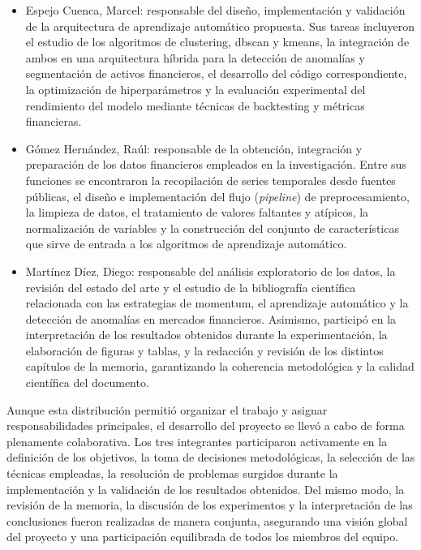 \documentclass[
]{article}
\begin{document}
	\begin{itemize}
		\item Espejo Cuenca, Marcel: responsable del diseño, implementación y validación de la arquitectura de aprendizaje automático propuesta. Sus tareas incluyeron el estudio de los algoritmos de \gls{clustering}, \gls{dbscan} y \gls{kmeans}, la integración de ambos en una arquitectura híbrida para la detección de anomalías y segmentación de activos financieros, el desarrollo del código correspondiente, la optimización de hiperparámetros y la evaluación experimental del rendimiento del modelo mediante técnicas de backtesting y métricas financieras.
		\item Gómez Hernández, Raúl: responsable de la obtención, integración y preparación de los datos financieros empleados en la investigación. Entre sus funciones se encontraron la recopilación de series temporales desde fuentes públicas, el diseño e implementación del flujo (\textit{pipeline}) de preprocesamiento, la limpieza de datos, el tratamiento de valores faltantes y atípicos, la normalización de variables y la construcción del conjunto de características que sirve de entrada a los algoritmos de aprendizaje automático.
		\item Martínez Díez, Diego: responsable del análisis exploratorio de los datos, la revisión del estado del arte y el estudio de la bibliografía científica relacionada con las estrategias de \gls{momentum}, el aprendizaje automático y la detección de anomalías en mercados financieros. Asimismo, participó en la interpretación de los resultados obtenidos durante la experimentación, la elaboración de figuras y tablas, y la redacción y revisión de los distintos capítulos de la memoria, garantizando la coherencia metodológica y la calidad científica del documento.
	\end{itemize}
	
	Aunque esta distribución permitió organizar el trabajo y asignar responsabilidades principales, el desarrollo del proyecto se llevó a cabo de forma plenamente colaborativa. Los tres integrantes participaron activamente en la definición de los objetivos, la toma de decisiones metodológicas, la selección de las técnicas empleadas, la resolución de problemas surgidos durante la implementación y la validación de los resultados obtenidos. Del mismo modo, la revisión de la memoria, la discusión de los experimentos y la interpretación de las conclusiones fueron realizadas de manera conjunta, asegurando una visión global del proyecto y una participación equilibrada de todos los miembros del equipo.
	
\end{document}
